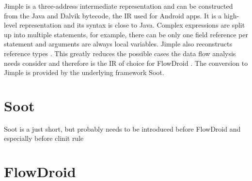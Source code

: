 \documentclass[../draft.tex]{subfiles}
\begin{document}
    Jimple is a three-address intermediate representation and can be constructed from the Java and Dalvik bytecode, the IR used for Android apps. It is a high-level representation and its syntax is close to Java. Complex expressions are split up into multiple statements, for example, there can be only one field reference per statement and arguments are always local variables. Jimple also reconstructs reference types \cite{Valleerai2004}. This greatly reduces the possible cases the data flow analysis needs consider and therefore is the IR of choice for FlowDroid \cite{Arzt2017PhD}. 
    The conversion to Jimple is provided by the underlying framework Soot. 

    \section{Soot}
    Soot is a 
    just short, but probably needs to be introduced before FlowDroid and especially before clinit rule
    \section{FlowDroid}    
\end{document}
